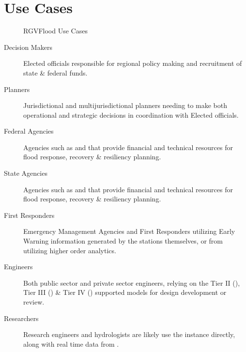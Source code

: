 \documentclass[letterpaper,10pt,english]{sphinxmanual}
\begin{document}
\chapter{Use Cases}
\label{\detokenize{predevelopment/use-cases/use-cases:use-cases}}\label{\detokenize{predevelopment/use-cases/use-cases::doc}}
\begin{figure}[htbp]
\centering
\capstart

\noindent{}
\caption{RGVFlood Use Cases}\label{\detokenize{predevelopment/use-cases/use-cases:id1}}\end{figure}
\begin{description}
\item[{Decision Makers}] \leavevmode
\sphinxAtStartPar
Elected officials responsible for regional policy making and recruitment of state \& federal funds.

\item[{Planners}] \leavevmode
\sphinxAtStartPar
Jurisdictional and multi\sphinxhyphen{}jurisdictional planners needing to make both operational and strategic decisions in coordination with Elected officials.

\item[{Federal Agencies}] \leavevmode
\sphinxAtStartPar
Agencies such as  and  that provide financial and technical resources for flood response, recovery \& resiliency planning.

\item[{State Agencies}] \leavevmode
\sphinxAtStartPar
Agencies such as  and  that provide financial and technical resources for flood response, recovery \& resiliency planning.

\item[{First Responders}] \leavevmode
\sphinxAtStartPar
Emergency Management Agencies and First Responders utilizing Early Warning information generated by the  stations themselves, or from  utilizing higher order analytics.

\item[{Engineers}] \leavevmode
\sphinxAtStartPar
Both public sector and private sector engineers, relying on the  Tier II (), Tier III () \& Tier IV () supported models for design development or review.

\item[{Researchers}] \leavevmode
\sphinxAtStartPar
Research engineers and hydrologists are likely use the   instance directly, along with real time data from .

\end{description}


\renewcommand{\indexname}{Index}
\printindex
\end{document}
